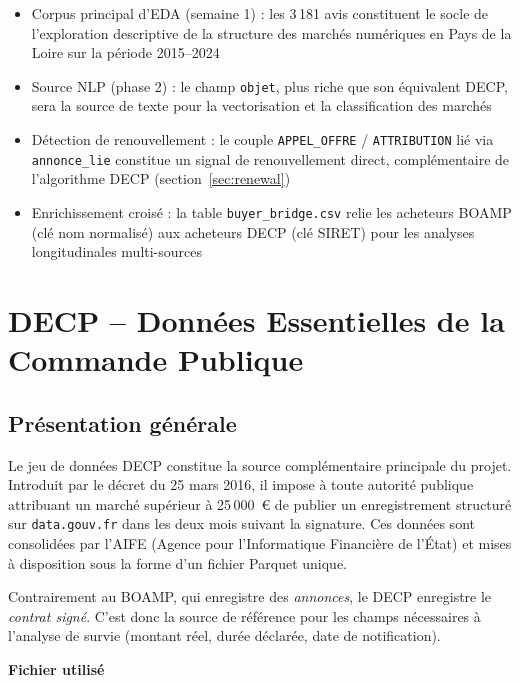 \documentclass[12pt,a4paper]{article}
\begin{document}
\begin{itemize}
  \item[---] Corpus principal d'EDA (semaine 1) : les 3\,181 avis constituent
    le socle de l'exploration descriptive de la structure des marchés numériques
    en Pays de la Loire sur la période 2015--2024
  \item[---] Source NLP (phase 2) : le champ \texttt{objet}, plus riche que
    son équivalent DECP, sera la source de texte pour la vectorisation et la
    classification des marchés
  \item[---] Détection de renouvellement : le couple \texttt{APPEL\_OFFRE} /
    \texttt{ATTRIBUTION} lié via \texttt{annonce\_lie} constitue un signal de
    renouvellement direct, complémentaire de l'algorithme DECP
    (section~\ref{sec:renewal})
  \item[---] Enrichissement croisé : la table \texttt{buyer\_bridge.csv} relie
    les acheteurs BOAMP (clé nom normalisé) aux acheteurs DECP (clé SIRET)
    pour les analyses longitudinales multi-sources
\end{itemize}

\section{DECP -- Données Essentielles de la Commande Publique}
\label{sec:decp}

\subsection{Présentation générale}

Le jeu de données DECP constitue la source complémentaire principale du projet.
Introduit par le décret du 25 mars 2016, il impose à toute autorité publique
attribuant un marché supérieur à 25\,000~€ de publier un enregistrement
structuré sur \texttt{data.gouv.fr} dans les deux mois suivant la signature.
Ces données sont consolidées par l'AIFE (Agence pour l'Informatique Financière
de l'État) et mises à disposition sous la forme d'un fichier Parquet unique.

Contrairement au BOAMP, qui enregistre des \emph{annonces}, le DECP enregistre
le \emph{contrat signé}. C'est donc la source de référence pour les champs
nécessaires à l'analyse de survie (montant réel, durée déclarée, date de
notification).

\medskip
\textbf{Fichier utilisé}
\end{document}
